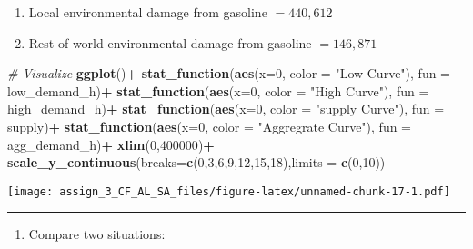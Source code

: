 \documentclass[]{article}
\newenvironment{Shaded}{\begin{snugshade}}{\end{snugshade}}
\newcommand{\CommentTok}[1]{\textcolor[rgb]{0.56,0.35,0.01}{\textit{#1}}}
\newcommand{\DataTypeTok}[1]{\textcolor[rgb]{0.13,0.29,0.53}{#1}}
\newcommand{\DecValTok}[1]{\textcolor[rgb]{0.00,0.00,0.81}{#1}}
\newcommand{\KeywordTok}[1]{\textcolor[rgb]{0.13,0.29,0.53}{\textbf{#1}}}
\newcommand{\NormalTok}[1]{#1}
\newcommand{\OperatorTok}[1]{\textcolor[rgb]{0.81,0.36,0.00}{\textbf{#1}}}
\newcommand{\StringTok}[1]{\textcolor[rgb]{0.31,0.60,0.02}{#1}}
\providecommand{\tightlist}{%
  \setlength{\itemsep}{0pt}\setlength{\parskip}{0pt}}
\begin{document}
\begin{enumerate}
\def\labelenumi{\alph{enumi}.}
\setcounter{enumi}{3}
\item
  Local environmental damage from gasoline \(=440,612\)
\item
  Rest of world environmental damage from gasoline \(=146,871\)
\end{enumerate}

\begin{Shaded}
\begin{Highlighting}[]
\CommentTok{# Visualize}
\KeywordTok{ggplot}\NormalTok{()}\OperatorTok{+}
\StringTok{  }\KeywordTok{stat_function}\NormalTok{(}\KeywordTok{aes}\NormalTok{(}\DataTypeTok{x=}\DecValTok{0}\NormalTok{, }\DataTypeTok{color =} \StringTok{"Low Curve"}\NormalTok{), }\DataTypeTok{fun =}\NormalTok{ low_demand_h)}\OperatorTok{+}
\StringTok{  }\KeywordTok{stat_function}\NormalTok{(}\KeywordTok{aes}\NormalTok{(}\DataTypeTok{x=}\DecValTok{0}\NormalTok{, }\DataTypeTok{color =} \StringTok{"High Curve"}\NormalTok{), }\DataTypeTok{fun =}\NormalTok{ high_demand_h)}\OperatorTok{+}
\StringTok{  }\KeywordTok{stat_function}\NormalTok{(}\KeywordTok{aes}\NormalTok{(}\DataTypeTok{x=}\DecValTok{0}\NormalTok{, }\DataTypeTok{color =} \StringTok{"supply Curve"}\NormalTok{), }\DataTypeTok{fun =}\NormalTok{ supply)}\OperatorTok{+}\StringTok{ }\KeywordTok{stat_function}\NormalTok{(}\KeywordTok{aes}\NormalTok{(}\DataTypeTok{x=}\DecValTok{0}\NormalTok{, }\DataTypeTok{color =} \StringTok{"Aggregrate Curve"}\NormalTok{), }\DataTypeTok{fun =}\NormalTok{ agg_demand_h)}\OperatorTok{+}\StringTok{ }
\KeywordTok{xlim}\NormalTok{(}\DecValTok{0}\NormalTok{,}\DecValTok{400000}\NormalTok{)}\OperatorTok{+}\StringTok{ }
\StringTok{  }\KeywordTok{scale_y_continuous}\NormalTok{(}\DataTypeTok{breaks=}\KeywordTok{c}\NormalTok{(}\DecValTok{0}\NormalTok{,}\DecValTok{3}\NormalTok{,}\DecValTok{6}\NormalTok{,}\DecValTok{9}\NormalTok{,}\DecValTok{12}\NormalTok{,}\DecValTok{15}\NormalTok{,}\DecValTok{18}\NormalTok{),}\DataTypeTok{limits =} \KeywordTok{c}\NormalTok{(}\DecValTok{0}\NormalTok{,}\DecValTok{10}\NormalTok{))}
\end{Highlighting}
\end{Shaded}

\texttt{[image: assign\_3\_CF\_AL\_SA\_files/figure-latex/unnamed-chunk-17-1.pdf]}

\begin{center}\rule{0.5\linewidth}{0.5pt}\end{center}

\begin{enumerate}
\def\labelenumi{\arabic{enumi}.}
\setcounter{enumi}{5}
\tightlist
\item
  Compare two situations:
\end{enumerate}
\end{document}
